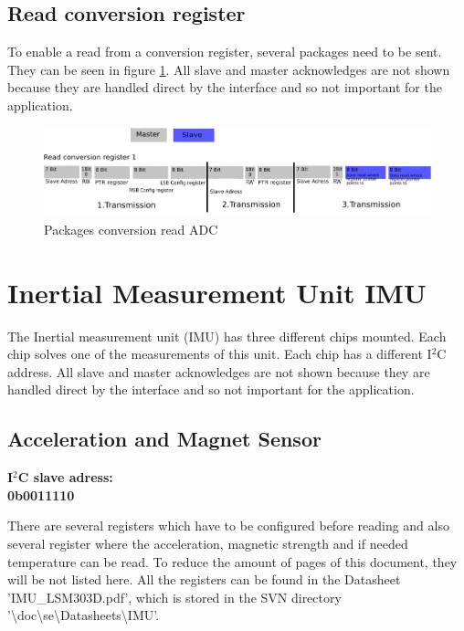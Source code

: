\subsection{Read conversion register}
\label{subsec:ADCconversion}

To enable a read from a conversion register, several packages need to be sent. They can be seen in figure \ref{fig:ADC3}. All slave and master acknowledges are not shown because they are handled direct by the interface and so not important for the application.

\begin{figure}[H]
	\centering\includegraphics[width=1\textwidth]{fig/ADC_read_conversion}
	\caption{Packages conversion read ADC}
	\label{fig:ADC3}
\end{figure}

\section{Inertial Measurement Unit IMU}
\label{sec:ADC}

The Inertial measurement unit (IMU) has three different chips mounted. Each chip solves one of the measurements of this unit. Each chip has a different I$^2$C address. All slave and master acknowledges are not shown because they are handled direct by the interface and so not important for the application.

\subsection{Acceleration and Magnet Sensor}
\label{subsec:ACC}

\textbf{I$^2$C slave adress:\\
0b0011110}

There are several registers which have to be configured before reading and also several register where the acceleration, magnetic strength and if needed temperature can be read. To reduce the amount of pages of this document, they will be not listed here. All the registers can be found in the Datasheet 'IMU\_LSM303D.pdf', which is stored in the SVN directory '\textbackslash{}doc\textbackslash{}se\textbackslash{}Datasheets\textbackslash{}IMU'.

